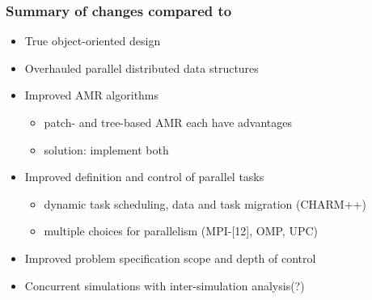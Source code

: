 \begin{frame}
\frametitle{Summary of changes compared to \enzo}
\begin{itemize}
\item {} True object-oriented design
\item {} Overhauled parallel distributed data structures
\item {} Improved AMR algorithms
\begin{itemize}
\item {}  patch- and tree-based AMR each have advantages
\item {} solution: implement both
\end{itemize}
\item {} Improved definition and control of parallel tasks
\begin{itemize}
\item {} dynamic task scheduling, data and task migration (CHARM++)
\item {} multiple choices for parallelism (MPI-[12], OMP, UPC)
\end{itemize}
\item {} Improved problem specification scope and depth of control
\item {} Concurrent simulations with inter-simulation analysis(?)
\end{itemize}
\end{frame}
